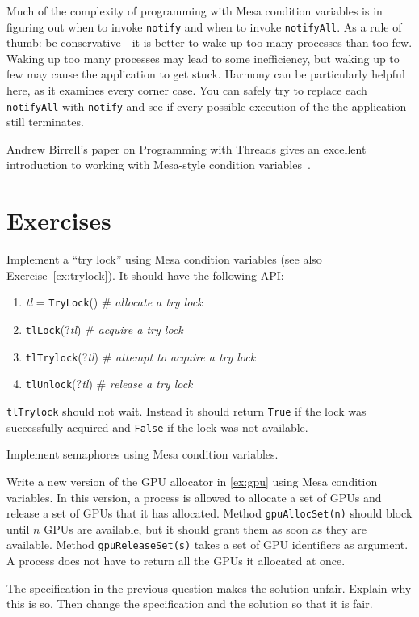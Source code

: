 \documentclass{report}
\begin{document}
Much of the complexity of programming with Mesa condition variables is in figuring out
when to invoke \texttt{notify} and when to invoke \texttt{notifyAll}.  As a rule of
thumb: be conservative---it is better to wake up too many processes than too few.
Waking up too many processes may lead to some inefficiency, but waking up to few
may cause the application to get stuck.  Harmony can be particularly helpful here, as
it examines every corner case.  You can safely try to replace each \texttt{notifyAll}
with \texttt{notify} and see if every possible execution of the the application still
terminates.

Andrew Birrell's paper on Programming with Threads gives an excellent
introduction to working with Mesa-style condition variables~\cite{Birrell89}.

\section*{Exercises}
\begin{problems}
\item Implement a ``try lock'' using Mesa condition variables
(see also Exercise~\ref{ex:trylock}).  It should
have the following API:
\begin{enumerate}
\item \textit{tl} = \texttt{TryLock}() \# \emph{allocate a try lock}
\item \texttt{tlLock}(?\textit{tl}) \# \emph{acquire a try lock}
\item \texttt{tlTrylock}(?\textit{tl}) \# \emph{attempt to acquire a try lock}
\item \texttt{tlUnlock}(?\textit{tl}) \# \emph{release a try lock}
\end{enumerate}
\noindent
\texttt{tlTrylock} should not wait.
Instead it should return \texttt{True} if the lock was successfully
acquired and \texttt{False} if the lock was not available.
\item Implement semaphores using Mesa condition variables.
\item Write a new version of the GPU allocator in \autoref{ex:gpu}
using Mesa condition variables.
In this version,
a process is allowed to allocate a set of GPUs and release a set of GPUs that it
has allocated.  Method \texttt{gpuAllocSet(n)} should block until $n$ GPUs are
available, but it should grant them as soon as they are available.
Method \texttt{gpuReleaseSet(s)} takes a set of GPU identifiers as argument.
A process does not have to return all the GPUs it allocated at once.
\item The specification in the previous question makes the solution unfair.
Explain why this is so.  Then change the specification and the solution so that
it is fair.
\end{problems}
\end{document}

